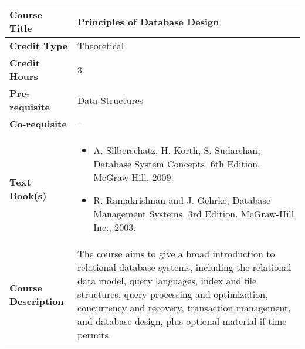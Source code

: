 \documentclass[11pt]{article}
\begin{document}
\begin{table}[h!]
\begin{tabular}{|l|l|}
\hline
\textbf{Course Title}       &  Principles of Database Design \\ \hline
\textbf{Credit Type}        & Theoretical  \\ \hline
\textbf{Credit Hours}       & 3 \\ \hline
\textbf{Pre-requisite}       & Data Structures \\ \hline
\textbf{Co-requisite}       & -- \\ \hline
\textbf{Text Book(s)}       & \begin{minipage}{.70\textwidth}
\begin{itemize} \itemsep-0.4em
	\vspace{3mm}
	\item  A. Silberschatz, H. Korth, S. Sudarshan, Database System Concepts, 6th Edition, McGraw-Hill, 2009. 
	\item R. Ramakrishnan and J. Gehrke, Database Management Systems. 3rd Edition. McGraw-Hill Inc., 2003.
	\vspace{3mm}
\end{itemize}
\end{minipage}\\ \hline
\textbf{Course Description} & \begin{minipage}{.70\textwidth}
\vspace{3mm}
The course aims to give a broad introduction to relational database systems,
including the relational data model, query languages, index and file structures, query processing and
optimization, concurrency and recovery, transaction management, and database design, plus optional
material if time permits. 
\vspace{3mm}
\end{minipage} \\ \hline
\end{tabular}
\end{table}
\end{document}
